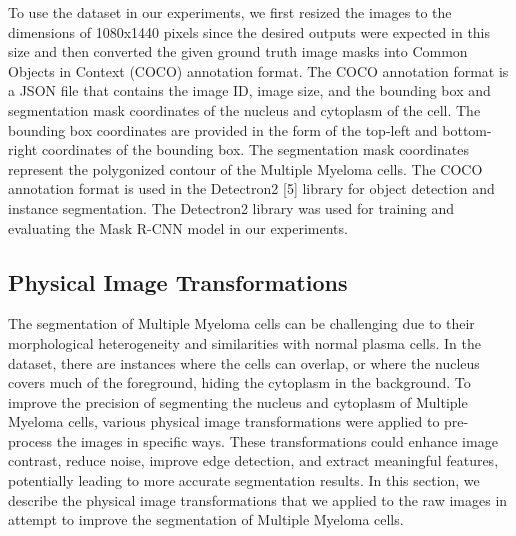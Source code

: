 \documentclass{article}
\begin{document}
To use the dataset in our experiments, we first resized the images to the dimensions of 1080x1440 pixels since the desired outputs were expected in this size and then converted the given ground truth image masks into Common Objects in Context (COCO) annotation format. The COCO annotation format is a JSON file that contains the image ID, image size, and the bounding box and segmentation mask coordinates of the nucleus and cytoplasm of the cell. The bounding box coordinates are provided in the form of the top-left and bottom-right coordinates of the bounding box. The segmentation mask coordinates represent the polygonized contour of the Multiple Myeloma cells. The COCO annotation format is used in the Detectron2 [5] library for object detection and instance segmentation. The Detectron2 library was used for training and evaluating the Mask R-CNN model in our experiments.

\subsection{Physical Image Transformations}

The segmentation of Multiple Myeloma cells can be challenging due to their morphological heterogeneity and similarities with normal plasma cells. In the dataset, there are instances where the cells can overlap, or where the nucleus covers much of the foreground, hiding the cytoplasm in the background. To improve the precision of segmenting the nucleus and cytoplasm of Multiple Myeloma cells, various physical image transformations were applied to pre-process the images in specific ways. These transformations could enhance image contrast, reduce noise, improve edge detection, and extract meaningful features, potentially leading to more accurate segmentation results. In this section, we describe the physical image transformations that we applied to the raw images in attempt to improve the segmentation of Multiple Myeloma cells.
\end{document}
